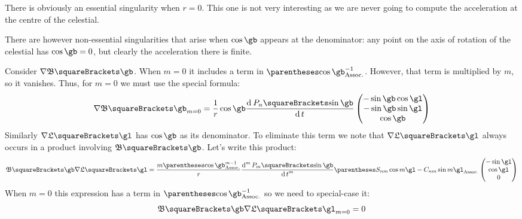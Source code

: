 \documentclass[10pt, a4paper, oneside]{basestyle}
\begin{document}
There is obviously an essential singularity when $r = 0$.  This one is not very interesting as we are never going to compute the acceleration at the centre of the celestial.

There are however non-essential singularities that arise when $\cos \gb$ appears at the denominator: any point on the axis of rotation of the celestial has $\cos \gb = 0$, but clearly the acceleration there is finite.

Consider $\grad \mathfrak B\of \gb$.  When $m = 0$ it includes a term in $\pa{\cos \gb}^{-1}$.  However, that term is multiplied by $m$, so it vanishes.  Thus, for $m = 0$ we must use the special formula:
\[
{\grad \mathfrak B\of \gb}_{m = 0} =  \frac{1}{r}
\cos \gb \deriv{t}{P_n\of {\sin \gb}}\begin{pmatrix}
-\sin \gb \cos \gl \\
-\sin \gb \sin \gl \\
\cos \gb
\end{pmatrix}
\]
Similarly $\grad \mathfrak L\of \gl$ has $\cos \gb$ as its denominator.  To eliminate this term we note that $\grad \mathfrak L\of \gl$ always occurs in a product involving $\mathfrak B\of \gb$.  Let's write this product:
\[
{\mathfrak B\of \gb}{\grad \mathfrak L\of \gl} = \frac{m \pa{\cos \gb}^{m - 1}}{r}
\deriv[m]{t}{P_m\of {\sin \gb}}
\pa{S_{n m} \cos m \gl - C_{n m} \sin m \gl}\begin{pmatrix}
-\sin \gl \\
\cos \gl \\
0
\end{pmatrix}
\]
When $m = 0$ this expression has a term in $\pa{\cos \gb}^{-1}$ so we need to special-case it:
\[
{\mathfrak B\of \gb}{\grad \mathfrak L\of \gl}_{m = 0} = 0
\]
\end{document}
